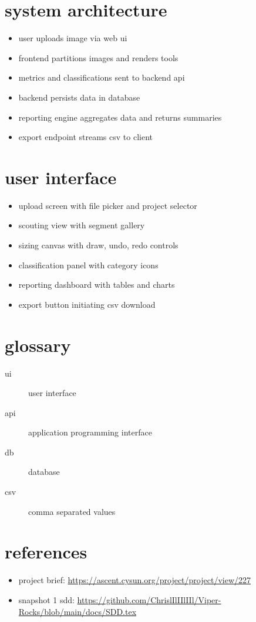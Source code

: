 \documentclass{article}
\begin{document}
\section{system architecture}
\begin{itemize}
\item user uploads image via web ui
\item frontend partitions images and renders tools
\item metrics and classifications sent to backend api
\item backend persists data in database
\item reporting engine aggregates data and returns summaries
\item export endpoint streams csv to client
\end{itemize}

\section{user interface}
\begin{itemize}
\item upload screen with file picker and project selector
\item scouting view with segment gallery
\item sizing canvas with draw, undo, redo controls
\item classification panel with category icons
\item reporting dashboard with tables and charts
\item export button initiating csv download
\end{itemize}

\section{glossary}
\begin{description}
\item[ui] user interface
\item[api] application programming interface
\item[db] database
\item[csv] comma separated values
\end{description}

\section{references}
\begin{itemize}
\item project brief: \url{https://ascent.cysun.org/project/project/view/227}
\item snapshot 1 sdd: \url{https://github.com/ChrislIlIIlIIl/Viper-Rocks/blob/main/docs/SDD.tex}
\end{itemize}
\end{document}
